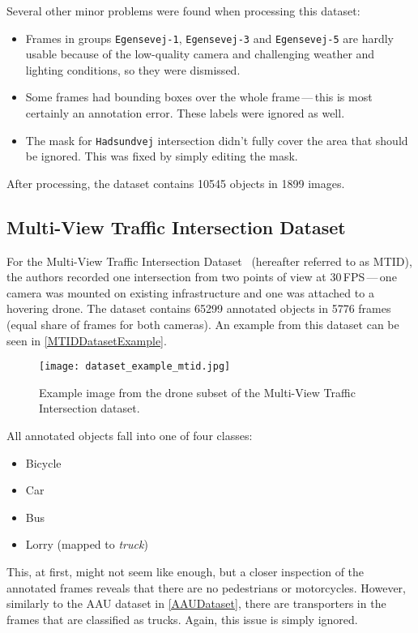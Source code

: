 Several other minor problems were found when processing this dataset:
\begin{itemize}
    \item Frames in groups \verb|Egensevej-1|, \verb|Egensevej-3| and
    \verb|Egensevej-5| are hardly usable because of the low-quality camera and
    challenging weather and lighting conditions, so they were dismissed.
    \item Some frames had bounding boxes over the whole frame\,---\,this is most
    certainly an annotation error. These labels were ignored as well.
    \item The mask for \verb|Hadsundvej| intersection didn't fully cover the
    area that should be ignored. This was fixed by simply editing the mask.
\end{itemize}

After processing, the dataset contains \num{10545} objects in \num{1899} images.


\subsection{Multi-View Traffic Intersection Dataset}

For the Multi-View Traffic Intersection Dataset~\cite{Jensen2020} (hereafter referred to as MTID), the
authors recorded one intersection from two points of view at 30\,FPS\,---\,one
camera was mounted on existing infrastructure and one was attached to a hovering
drone. The dataset contains \num{65299} annotated objects in \num{5776} frames
(equal share of frames for both cameras). An example from this dataset can be
seen in \autoref{MTIDDatasetExample}.

\begin{figure}[h]
    \centering
    \texttt{[image: dataset\_example\_mtid.jpg]}
    \caption{Example image from the drone subset of the Multi-View Traffic Intersection dataset.}
    \label{MTIDDatasetExample}
\end{figure}

All annotated objects fall into one of four classes:
\begin{itemize}
    \item Bicycle
    \item Car
    \item Bus
    \item Lorry (mapped to \textit{truck})
\end{itemize}
This, at first, might not seem like enough, but a closer inspection of the
annotated frames reveals that there are no pedestrians or motorcycles. However,
similarly to the AAU dataset in \autoref{AAUDataset}, there are transporters in the frames
that are classified as trucks. Again, this issue is simply ignored.

